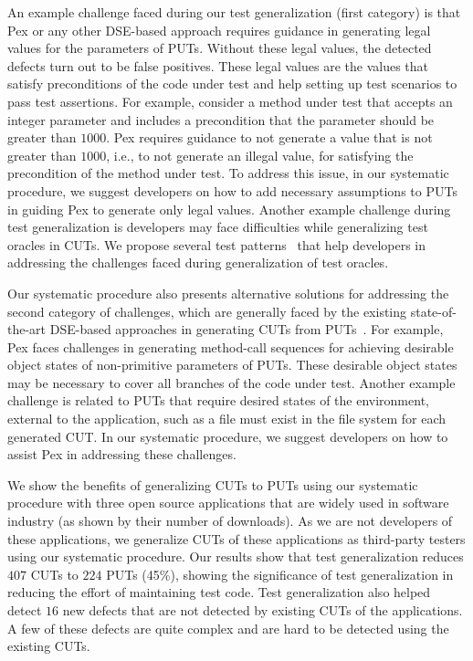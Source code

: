 An example challenge faced during our test generalization (first category) is that Pex or any other DSE-based approach requires guidance in generating legal values for the parameters of PUTs. Without these legal values, the detected defects turn out to be false positives. These legal values are the values that satisfy preconditions of the code under test and help setting up test scenarios to pass test assertions. For example, consider a method under test that accepts an integer parameter and includes a precondition that the parameter should be greater than $1000$. Pex requires guidance to not generate a value that is not greater than $1000$, i.e., to not generate an illegal value, for satisfying the precondition of the method under test. To address this issue, in our systematic procedure, we suggest developers on how to add necessary assumptions to PUTs in guiding Pex to generate only legal values. Another example challenge during test generalization is developers may face difficulties while generalizing test oracles in CUTs. We propose several test patterns~\cite{halleux08:putpatterns} that help developers in addressing the challenges faced during generalization of test oracles.

Our systematic procedure also presents alternative solutions for addressing the second category of challenges, which are generally faced by the existing state-of-the-art DSE-based approaches in generating CUTs from PUTs~\cite{thummalapenta09:mseqgen}. For example, Pex faces challenges in generating method-call sequences for achieving desirable object states of non-primitive parameters of PUTs. These desirable object states may be necessary to cover all branches of the code under test. Another example challenge is related to PUTs that require desired states of the environment, external to the application, such as a file must exist in the file system for each generated CUT. In our systematic procedure, we suggest developers on how to assist Pex in addressing these challenges.

We show the benefits of generalizing CUTs to PUTs using our systematic procedure with three open source applications that are widely used in software industry (as shown by their number of downloads). As we are not developers of these applications, we generalize CUTs of these applications as third-party testers using our systematic procedure. Our results show that test generalization reduces $407$ CUTs to $224$ PUTs (45\%), showing the significance of test generalization in reducing the effort of maintaining test code. Test generalization also helped detect $16$ new defects that are not detected by existing CUTs of the applications. A few of these defects are quite complex and are hard to be detected using the existing CUTs.


